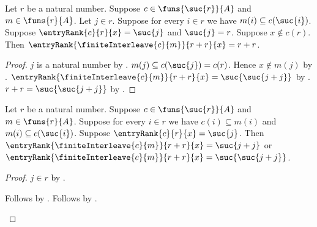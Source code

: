 \begin{corollary}\label{entry_rank_interleave_outside_last}
    Let $r$ be a natural number.
    Suppose $c\in\funs{\suc{r}}{A}$ and $m\in\funs{r}{A}$.
    Let $j\in r$.
    Suppose for every $i\in r$ we have
        $m(i)\subseteq c(\suc{i})$.
    Suppose $\entryRank{c}{r}{x}=\suc{j}$ and $\suc{j}=r$.
    Suppose $x\notin c(r)$.
    Then
        $\entryRank{\finiteInterleave{c}{m}}{r+r}{x}=r+r$.
\end{corollary}
\begin{proof}
    $j$ is a natural number
        by .
    $m(j)\subseteq c(\suc{j})=c(r)$.
    Hence $x\notin m(j)$ by .
    $\entryRank{\finiteInterleave{c}{m}}{r+r}{x}
        =\suc{\suc{j+j}}$
        by .
    $r+r=\suc{\suc{j+j}}$
        by .
\end{proof}

\begin{theorem}\label{entry_rank_under_finite_interleave}
    Let $r$ be a natural number.
    Suppose $c\in\funs{\suc{r}}{A}$ and $m\in\funs{r}{A}$.
    Suppose for every $i\in r$ we have
        $c(i)\subseteq m(i)$ and $m(i)\subseteq c(\suc{i})$.
    Suppose $\entryRank{c}{r}{x}=\suc{j}$.
    Then
        $\entryRank{\finiteInterleave{c}{m}}{r+r}{x}
            =\suc{j+j}$ or
        $\entryRank{\finiteInterleave{c}{m}}{r+r}{x}
            =\suc{\suc{j+j}}$.
\end{theorem}
\begin{proof}
    $j\in r$ by .
    \begin{byCase}
        Follows by .
        Follows by .
    \end{byCase}
\end{proof}
